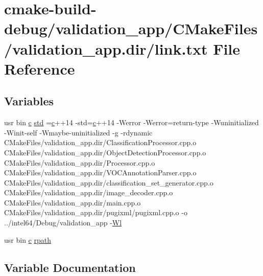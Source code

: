 \hypertarget{validation__app_2CMakeFiles_2validation__app_8dir_2link_8txt}{}\section{cmake-\/build-\/debug/validation\+\_\+app/\+C\+Make\+Files/validation\+\_\+app.dir/link.txt File Reference}
\label{validation__app_2CMakeFiles_2validation__app_8dir_2link_8txt}
\subsection*{Variables}
\begin{DoxyCompactItemize}
\item 
usr bin \hyperlink{CMakeCache_8txt_aac1d6a1710812201527c735f7c6afbaa}{c} \hyperlink{validation__app_2CMakeFiles_2validation__app_8dir_2link_8txt_a1ccfea5f558575a112db71eeb271fabf}{std} =\hyperlink{CMakeCache_8txt_aac1d6a1710812201527c735f7c6afbaa}{c}++14 -\/std=\hyperlink{CMakeCache_8txt_aac1d6a1710812201527c735f7c6afbaa}{c}++14 -\/Werror -\/Werror=return-\/type -\/Wuninitialized -\/Winit-\/self -\/Wmaybe-\/uninitialized -\/g -\/rdynamic C\+Make\+Files/validation\+\_\+app.\+dir/Classification\+Processor.\+cpp.\+o C\+Make\+Files/validation\+\_\+app.\+dir/Object\+Detection\+Processor.\+cpp.\+o C\+Make\+Files/validation\+\_\+app.\+dir/Processor.\+cpp.\+o C\+Make\+Files/validation\+\_\+app.\+dir/V\+O\+C\+Annotation\+Parser.\+cpp.\+o C\+Make\+Files/validation\+\_\+app.\+dir/classification\+\_\+set\+\_\+generator.\+cpp.\+o C\+Make\+Files/validation\+\_\+app.\+dir/image\+\_\+decoder.\+cpp.\+o C\+Make\+Files/validation\+\_\+app.\+dir/main.\+cpp.\+o C\+Make\+Files/validation\+\_\+app.\+dir/pugixml/pugixml.\+cpp.\+o -\/o ../intel64/Debug/validation\+\_\+app -\/\hyperlink{thirdparty_2extension_2CMakeFiles_2cpu__extension_8dir_2link_8txt_af9ccbf658ed2deb89d0d79f211e5b033}{Wl}
\item 
usr bin \hyperlink{CMakeCache_8txt_aac1d6a1710812201527c735f7c6afbaa}{c} \hyperlink{validation__app_2CMakeFiles_2validation__app_8dir_2link_8txt_ab9d7fd7120fafa2118a4e08c1df697c7}{rpath}
\end{DoxyCompactItemize}


\subsection{Variable Documentation}
